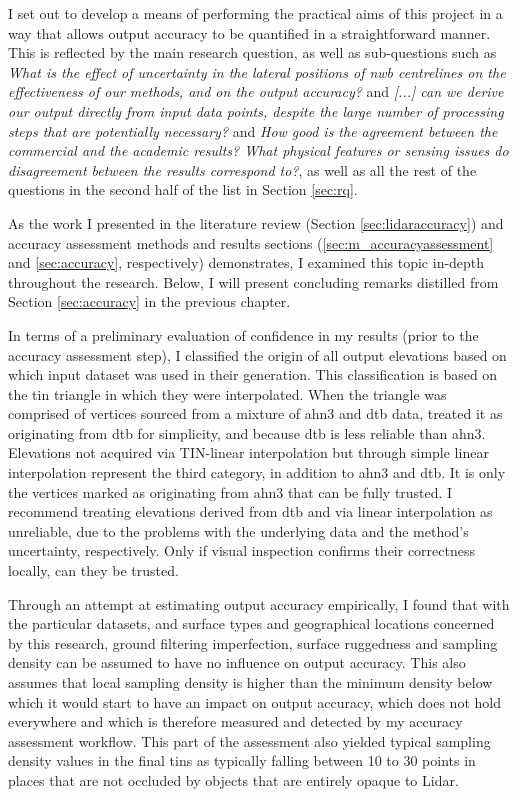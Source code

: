 I set out to develop a means of performing the practical aims of this project in a way that allows output accuracy to be quantified in a straightforward manner. This is reflected by the main research question, as well as sub-questions such as \textit{What is the effect of uncertainty in the lateral positions of \ac{nwb} centrelines on the effectiveness of our methods, and on the output accuracy?} and \textit{[...] can we derive our output directly from input data points, despite the large number of processing steps that are potentially necessary?} and \textit{How good is the agreement between the commercial and the academic results? What physical features or sensing issues do disagreement between the results correspond to?}, as well as all the rest of the questions in the second half of the list in Section \ref{sec:rq}.

As the work I presented in the literature review (Section \ref{sec:lidaraccuracy}) and accuracy assessment methods and results sections (\ref{sec:m_accuracyassessment} and \ref{sec:accuracy}, respectively) demonstrates, I examined this topic in-depth throughout the research. Below, I will present concluding remarks distilled from Section \ref{sec:accuracy} in the previous chapter.

In terms of a preliminary evaluation of confidence in my results (prior to the accuracy assessment step), I classified the origin of all output elevations based on which input dataset was used in their generation. This classification is based on the \ac{tin} triangle in which they were interpolated. When the triangle was comprised of vertices sourced from a mixture of \ac{ahn3} and \ac{dtb} data, treated it as originating from \ac{dtb} for simplicity, and because \ac{dtb} is less reliable than \ac{ahn3}. Elevations not acquired via TIN-linear interpolation but through simple linear interpolation represent the third category, in addition to \ac{ahn3} and \ac{dtb}. It is only the vertices marked as originating from \ac{ahn3} that can be fully trusted. I recommend treating elevations derived from \ac{dtb} and via linear interpolation as unreliable, due to the problems with the underlying data and the method's uncertainty, respectively. Only if visual inspection confirms their correctness locally, can they be trusted.

Through an attempt at estimating output accuracy empirically, I found that with the particular datasets, and surface types and geographical locations concerned by this research, ground filtering imperfection, surface ruggedness and sampling density can be assumed to have no influence on output accuracy. This also assumes that local sampling density is higher than the minimum density below which it would start to have an impact on output accuracy, which does not hold everywhere and which is therefore measured and detected by my accuracy assessment workflow. This part of the assessment also yielded typical sampling density values in the final \ac{tin}s as typically falling between 10 to 30 points in places that are not occluded by objects that are entirely opaque to Lidar.

